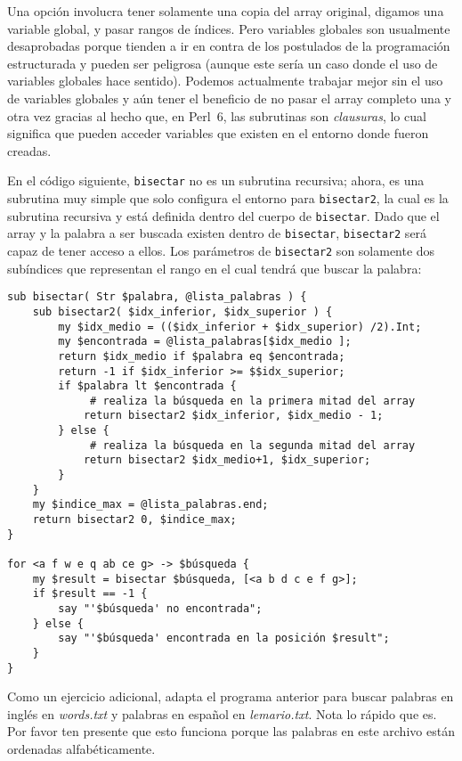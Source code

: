 Una opción involucra tener solamente una copia del
array original, digamos una variable global, y 
pasar rangos de índices. Pero variables globales
son usualmente desaprobadas porque tienden a ir
en contra de los postulados de la programación estructurada
y pueden ser peligrosa (aunque este sería un caso
donde el uso de variables globales hace sentido).
Podemos actualmente trabajar mejor sin el uso de variables
globales y aún tener el beneficio de no pasar el array 
completo una y otra vez gracias al hecho que, en Perl~6,
las subrutinas son \emph{clausuras}, lo cual significa que 
pueden acceder variables que existen en el entorno donde
fueron creadas.

En el código siguiente, {\tt bisectar} no es un subrutina
recursiva; ahora, es una subrutina muy simple que solo 
configura el entorno para {\tt bisectar2}, la cual es 
la subrutina recursiva y está definida dentro del cuerpo de
{\tt bisectar}. Dado que el array y la palabra a ser buscada
existen dentro de {\tt bisectar}, {\tt bisectar2} será capaz
de tener acceso a ellos. Los parámetros de {\tt bisectar2} 
son solamente dos subíndices que representan el rango en 
el cual tendrá que buscar la palabra:

\begin{verbatim}
sub bisectar( Str $palabra, @lista_palabras ) {
    sub bisectar2( $idx_inferior, $idx_superior ) {
        my $idx_medio = (($idx_inferior + $idx_superior) /2).Int;
        my $encontrada = @lista_palabras[$idx_medio ];
        return $idx_medio if $palabra eq $encontrada;
        return -1 if $idx_inferior >= $$idx_superior;
        if $palabra lt $encontrada {
             # realiza la búsqueda en la primera mitad del array
            return bisectar2 $idx_inferior, $idx_medio - 1;
        } else {
             # realiza la búsqueda en la segunda mitad del array
            return bisectar2 $idx_medio+1, $idx_superior;
        }
    }
    my $indice_max = @lista_palabras.end;
    return bisectar2 0, $indice_max;
}

for <a f w e q ab ce g> -> $búsqueda { 
    my $result = bisectar $búsqueda, [<a b d c e f g>];
    if $result == -1 {
        say "'$búsqueda' no encontrada";
    } else {
        say "'$búsqueda' encontrada en la posición $result";
    }
}
\end{verbatim}

Como un ejercicio adicional, adapta el programa anterior
para buscar palabras en inglés en \emph{words.txt} y
palabras en español en \emph{lemario.txt}. Nota lo rápido
que es. Por favor ten presente que esto funciona porque las
palabras en este archivo están ordenadas alfabéticamente.

